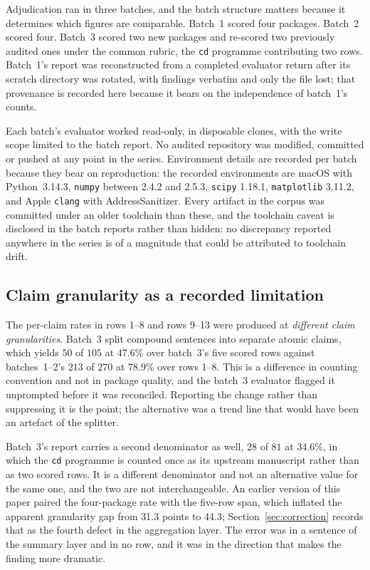 \documentclass[sigconf,review]{acmart}
\newcommand{\pkg}[1]{\texttt{#1}}
\begin{document}
Adjudication ran in three batches, and the batch structure matters because it
determines which figures are comparable. Batch~1 scored four packages. Batch~2
scored four. Batch~3 scored two new packages and re-scored two previously
audited ones under the common rubric, the \pkg{cd} programme contributing two
rows. Batch~1's report was reconstructed from a completed evaluator return
after its scratch directory was rotated, with findings verbatim and only the
file lost; that provenance is recorded here because it bears on the
independence of batch~1's counts.

Each batch's evaluator worked read-only, in disposable clones, with the write
scope limited to the batch report. No audited repository was modified,
committed or pushed at any point in the series. Environment details are
recorded per batch because they bear on reproduction: the recorded environments
are macOS with Python~3.14.3, \pkg{numpy} between 2.4.2 and 2.5.3,
\pkg{scipy} 1.18.1, \pkg{matplotlib} 3.11.2, and Apple \pkg{clang} with
AddressSanitizer. Every artifact in the corpus was committed under an older
toolchain than these, and the toolchain caveat is disclosed in the batch
reports rather than hidden: no discrepancy reported anywhere in the series is
of a magnitude that could be attributed to toolchain drift.

\subsection{Claim granularity as a recorded limitation}
\label{sec:granularity}

The per-claim rates in rows 1--8 and rows 9--13 were produced at
\emph{different claim granularities}. Batch~3 split compound sentences into
separate atomic claims, which yields $50$ of $105$ at 47.6\% over batch~3's
five scored rows against batches~1--2's $213$ of $270$ at 78.9\% over rows
1--8. This is a difference in counting convention and not in package quality,
and the batch~3 evaluator flagged it unprompted before it was reconciled.
Reporting the change rather than suppressing it is the point; the alternative
was a trend line that would have been an artefact of the splitter.

Batch~3's report carries a second denominator as well, $28$ of $81$ at 34.6\%,
in which the \pkg{cd} programme is counted once as its upstream manuscript
rather than as two scored rows. It is a different denominator and not an
alternative value for the same one, and the two are not interchangeable. An
earlier version of this paper paired the four-package rate with the five-row
span, which inflated the apparent granularity gap from 31.3 points to 44.3;
Section~\ref{sec:correction} records that as the fourth defect in the
aggregation layer. The error was in a sentence of the summary layer and in no
row, and it was in the direction that makes the finding more dramatic.
\end{document}

